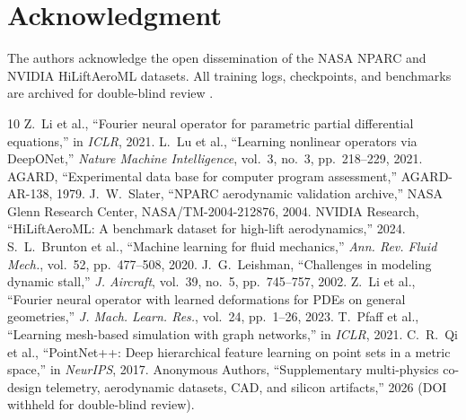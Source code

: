 \documentclass[journal,10pt,twocolumn]{IEEEtran}
\begin{document}
\section*{Acknowledgment}
The authors acknowledge the open dissemination of the NASA NPARC and NVIDIA HiLiftAeroML datasets. All training logs, checkpoints, and benchmarks are archived for double-blind review \cite{dixit2026zenodo}.

\begin{thebibliography}{10}
 Z.~Li et al., ``Fourier neural operator for parametric partial differential equations,'' in \emph{ICLR}, 2021.
 L.~Lu et al., ``Learning nonlinear operators via DeepONet,'' \emph{Nature Machine Intelligence}, vol.~3, no.~3, pp.~218--229, 2021.
 AGARD, ``Experimental data base for computer program assessment,'' AGARD-AR-138, 1979.
 J.~W.~Slater, ``NPARC aerodynamic validation archive,'' NASA Glenn Research Center, NASA/TM-2004-212876, 2004.
 NVIDIA Research, ``HiLiftAeroML: A benchmark dataset for high-lift aerodynamics,'' 2024.
 S.~L.~Brunton et al., ``Machine learning for fluid mechanics,'' \emph{Ann. Rev. Fluid Mech.}, vol.~52, pp.~477--508, 2020.
 J.~G.~Leishman, ``Challenges in modeling dynamic stall,'' \emph{J. Aircraft}, vol.~39, no.~5, pp.~745--757, 2002.
 Z.~Li et al., ``Fourier neural operator with learned deformations for PDEs on general geometries,'' \emph{J. Mach. Learn. Res.}, vol.~24, pp.~1--26, 2023.
 T.~Pfaff et al., ``Learning mesh-based simulation with graph networks,'' in \emph{ICLR}, 2021.
 C.~R.~Qi et al., ``PointNet++: Deep hierarchical feature learning on point sets in a metric space,'' in \emph{NeurIPS}, 2017.
 Anonymous Authors, ``Supplementary multi-physics co-design telemetry, aerodynamic datasets, CAD, and silicon artifacts,'' 2026 (DOI withheld for double-blind review).
\end{thebibliography}
\end{document}

